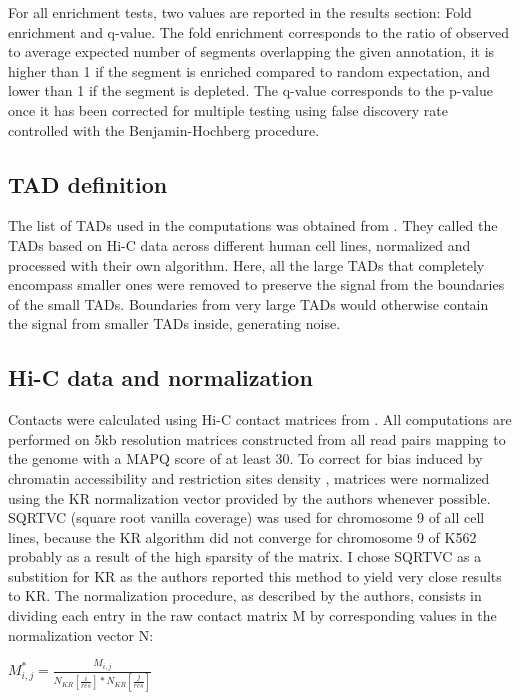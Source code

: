 \documentclass[11pt,a4paper]{report}
\begin{document}
For all enrichment tests, two values are reported in the results section: Fold enrichment and q-value. The fold enrichment corresponds to the ratio of observed to average expected number of segments overlapping the given annotation, it is higher than 1 if the segment is enriched compared to random expectation, and lower than 1 if the segment is depleted. The q-value corresponds to the p-value once it has been corrected for multiple testing using false discovery rate controlled with the Benjamin-Hochberg procedure.

\subsection*{TAD definition}

The list of TADs used in the computations was obtained from \cite{Rao2014}. They called the TADs based on Hi-C data across different human cell lines, normalized and processed with their own algorithm. Here, all the large TADs that completely encompass smaller ones were removed to preserve the signal from the boundaries of the small TADs. Boundaries from very large TADs would otherwise contain the signal from smaller TADs inside, generating noise.

\subsection*{Hi-C data and normalization}

Contacts were calculated using Hi-C contact matrices from \cite{Rao2014}. All computations are performed on 5kb resolution matrices constructed from all read pairs mapping to the genome with a MAPQ score of at least 30. To correct for bias induced by chromatin accessibility and restriction sites density \cite{Rao2014}, matrices were normalized using the KR normalization vector provided by the authors whenever possible. SQRTVC (square root vanilla coverage) was used for chromosome 9 of all cell lines, because the KR algorithm did not converge for chromosome 9 of K562 probably as a result of the high sparsity of the matrix. I chose SQRTVC as a substition for KR as the authors reported this method  to yield very close results to KR. 
The normalization procedure, as described by the authors, consists in dividing each entry in the raw contact matrix M by corresponding values in the normalization vector N:

\vspace{0.2in}
$M^*_{i,j}=\frac{M_{i,j}}{N_{KR}[\frac{i}{res}]*N_{KR}[\frac{j}{res}]}$
\vspace{0.2in}
\end{document}

